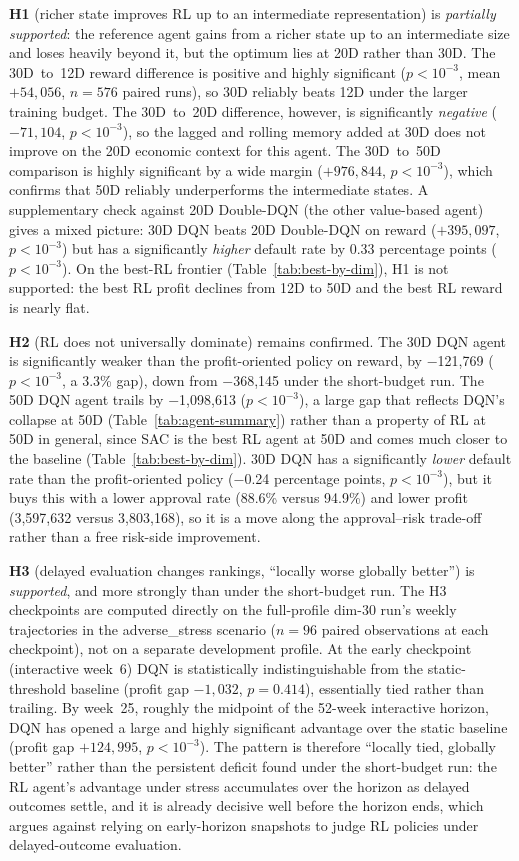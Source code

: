 \documentclass[preprint,review,authoryear,12pt]{elsarticle}
\begin{document}
\textbf{H1} (richer state improves RL up to an intermediate representation) is
\emph{partially supported}: the reference agent gains from a richer state up to an
intermediate size and loses heavily beyond it, but the optimum lies at 20D rather than
30D. The 30D~to~12D reward difference is positive and highly significant
($p<10^{-3}$, mean $+54{,}056$, $n=576$ paired runs), so 30D reliably beats 12D under the
larger training budget. The 30D~to~20D difference, however, is significantly
\emph{negative} ($-71{,}104$, $p<10^{-3}$), so the lagged and rolling memory added at 30D
does not improve on the 20D economic context for this agent. The 30D~to~50D comparison is
highly significant by a wide margin ($+976{,}844$, $p<10^{-3}$), which confirms that 50D
reliably underperforms the intermediate states. A supplementary check against 20D
Double-DQN (the other value-based agent) gives a mixed picture: 30D DQN beats 20D Double-DQN on reward ($+395{,}097$,
$p<10^{-3}$) but has a significantly \emph{higher} default rate by 0.33 percentage points
($p<10^{-3}$). On the best-RL frontier (Table~\ref{tab:best-by-dim}), H1 is not supported:
the best RL profit declines from 12D to 50D and the best RL reward is nearly flat.

\textbf{H2} (RL does not universally dominate) remains confirmed. The 30D DQN agent is
significantly weaker than the profit-oriented policy on reward, by $-$121{,}769
($p<10^{-3}$, a 3.3\% gap), down from $-$368{,}145 under the short-budget run. The 50D DQN
agent trails by $-$1{,}098{,}613 ($p<10^{-3}$), a large gap that reflects DQN's collapse
at 50D (Table~\ref{tab:agent-summary}) rather than a property of RL at 50D in general,
since SAC is the best RL agent at 50D and comes much closer to the baseline
(Table~\ref{tab:best-by-dim}). 30D DQN has a significantly \emph{lower} default rate than
the profit-oriented policy ($-$0.24 percentage points, $p<10^{-3}$), but it buys this with
a lower approval rate (88.6\% versus 94.9\%) and lower profit (3{,}597{,}632 versus
3{,}803{,}168), so it is a move along the approval--risk trade-off rather than a free
risk-side improvement.

\textbf{H3} (delayed evaluation changes rankings, ``locally worse globally better'') is
\emph{supported}, and more strongly than under the short-budget run. The H3 checkpoints
are computed directly on the full-profile dim-30 run's weekly trajectories in the
adverse\_stress scenario ($n=96$ paired observations at each checkpoint), not on a
separate development profile. At the early checkpoint (interactive week~6) DQN is
statistically indistinguishable from the static-threshold baseline (profit gap
$-1{,}032$, $p=0.414$), essentially tied rather than trailing. By week~25, roughly the
midpoint of the 52-week interactive horizon, DQN has opened a large and highly
significant advantage over the static baseline (profit gap $+124{,}995$, $p<10^{-3}$). The pattern is therefore
``locally tied, globally better'' rather than the persistent deficit found under the
short-budget run: the RL agent's advantage under stress accumulates over the horizon as
delayed outcomes settle, and it is already decisive well before the horizon ends, which
argues against relying on early-horizon snapshots to judge RL policies under
delayed-outcome evaluation.
\end{document}
